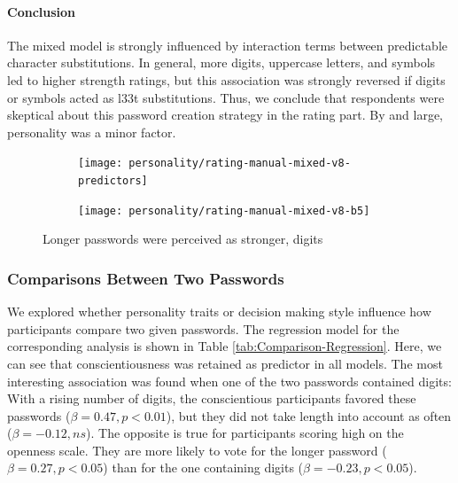 \paragraph{Conclusion} The mixed model is strongly influenced by interaction terms between predictable character substitutions. In general, more digits, uppercase letters, and symbols led to higher strength ratings, but this association was strongly reversed if digits or symbols acted as l33t substitutions. Thus, we conclude that respondents were skeptical about this password creation strategy in the rating part. By and large, personality was a minor factor.


\begin{figure}[htbp]
	\centering
	\begin{subfigure}[t]{\linewidth}
		\texttt{[image: personality/rating-manual-mixed-v8-predictors]}
	\end{subfigure}
	\begin{subfigure}[b]{\linewidth}
	\texttt{[image: personality/rating-manual-mixed-v8-b5]}
	\end{subfigure}
	\caption{\label{fig:personality:study2:rating-mixed-model}Longer passwords were perceived as stronger, digits }
\end{figure}

\subsubsection{Comparisons Between Two Passwords}
We explored whether personality traits or decision making style influence how participants compare two given passwords. The regression model for the corresponding analysis is shown in Table \ref{tab:Comparison-Regression}. Here, we can see that conscientiousness was retained as predictor in all models. The most interesting association was found when one of the two passwords contained digits: With a rising number of digits, the conscientious participants favored these passwords ($\beta = 0.47, p < 0.01$), but they did not take length into account as often ($\beta = -0.12, ns$). The opposite is true for participants scoring high on the openness scale. They are more likely to vote for the longer password ($\beta = 0.27, p < 0.05$) than for the one containing digits ($\beta = -0.23, p < 0.05$). 

